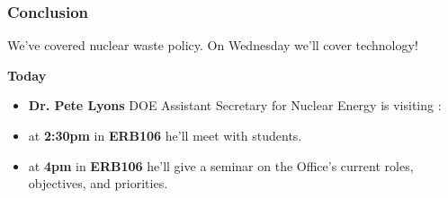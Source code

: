 \begin{frame}
  \frametitle{Conclusion}

  We've covered nuclear waste policy. On Wednesday we'll cover technology!

  \textbf{Today} 
  \begin{itemize}
    \item \textbf{Dr. Pete Lyons} DOE Assistant Secretary for Nuclear Energy is visiting :
    \item at \textbf{2:30pm} in \textbf{ERB106} he'll meet with students.
    \item at \textbf{4pm} in \textbf{ERB106} he'll give a seminar on the Office's current roles, objectives, and priorities.
\end{itemize}
\end{frame}
